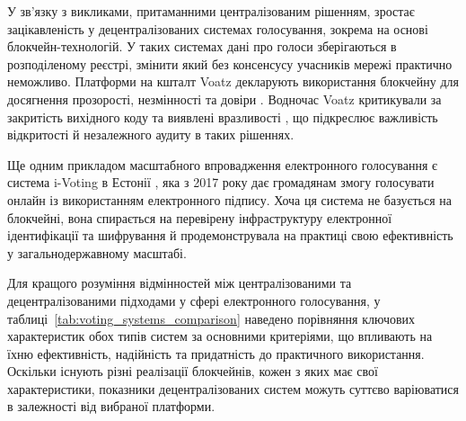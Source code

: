\documentclass[14pt]{extreport}
\begin{document}
  У зв’язку з викликами, притаманними централізованим рішенням, зростає зацікавленість у децентралізованих системах голосування, зокрема на основі блокчейн-технологій. У таких системах дані про голоси зберігаються в розподіленому реєстрі, змінити який без консенсусу учасників мережі практично неможливо. Платформи на кшталт Voatz декларують використання блокчейну для досягнення прозорості, незмінності та довіри \cite{voatz}. Водночас Voatz критикували за закритість вихідного коду та виявлені вразливості \cite{voatzcriticism}, що підкреслює важливість відкритості й незалежного аудиту в таких рішеннях.

  Ще одним прикладом масштабного впровадження електронного голосування є система i-Voting в Естонії \cite{ivoting}, яка з 2017 року дає громадянам змогу голосувати онлайн із використанням електронного підпису. Хоча ця система не базується на блокчейні, вона спирається на перевірену інфраструктуру електронної ідентифікації та шифрування й продемонструвала на практиці свою ефективність у загальнодержавному масштабі.
  
  Для кращого розуміння відмінностей між централізованими та децентралізованими підходами у сфері електронного голосування, у таблиці~\ref{tab:voting_systems_comparison} наведено порівняння ключових характеристик обох типів систем за основними критеріями, що впливають на їхню ефективність, надійність та придатність до практичного використання. Оскільки існують різні реалізації блокчейнів, кожен з яких має свої характеристики, показники децентралізованих систем можуть суттєво варіюватися в залежності від вибраної платформи.
  
  \begin{table}[H]
    \caption{\\\centering\textbf{Порівняння централізованих та децентралізованих систем голосування}}
    \label{tab:voting_systems_comparison}
  \end{table}
  
\end{document}
